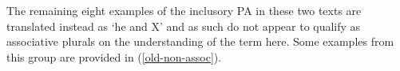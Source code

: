 \documentclass[output=paper,colorlinks,citecolor=brown]{langscibook}
\begin{document}


\largerpage
The remaining eight examples of the inclusory PA in these two texts are translated instead as `he and X' and as such do not appear to qualify as associative plurals on the understanding of the term here. Some examples from this group are provided in (\ref{old-non-assoc}).
\end{document}
